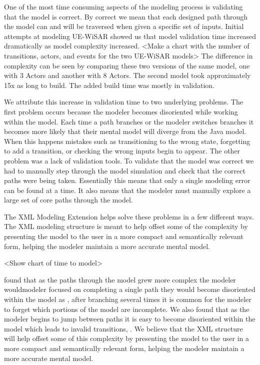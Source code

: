 One of the most time consuming aspects of the modeling process is validating that the model is correct.  By correct we mean that each designed path through the model can and will be traversed when given a specific set of inputs.  Initial attempts at modeling UE-WiSAR showed us that model validation time increased dramatically as model complexity increased.  <Make a chart with the number of transitions, actors, and events for the two UE-WiSAR models>  The difference in complexity can be seen by comparing these two versions of the same model, one with 3 Actors and another with 8 Actors.  The second model took approximately 15x as long to build.  The added build time was mostly in validation.

We attribute this increase in validation time to two underlying problems.  The first problem occurs because the modeler becomes disoriented while working within the model.  Each time a path branches or the modeler switches branches it becomes more likely that their mental model will diverge from the Java model.  When this happens mistakes such as transitioning to the wrong state, forgetting to add a transition, or checking the wrong inputs begin to appear.  The other problem was a lack of validation tools.  To validate that the model was correct we had to manually step through the model simulation and check that the correct paths were being taken.  Essentially this means that only a single modeling error can be found at a time.  It also means that the modeler must manually explore a large set of core paths through the model.

The XML Modeling Extension helps solve these problems in a few different ways.  The XML modeling structure is meant to help offset some of the complexity by presenting the model to the user in a more compact and semantically relevant form, helping the modeler maintain a more accurate mental model.


<Show chart of time to model>

 found that as the paths through the model grew more complex the modeler wouldmodeler focused on completing a single path they would become disoriented within the model as , after branching several times it is common for the modeler to forget which portions of the model are incomplete.  We also found that as the modeler begins to jump between paths it is easy to become disoriented within the model which leads to invalid transitions, .  We believe that the XML structure will help offset some of this complexity by presenting the model to the user in a more compact and semantically relevant form, helping the modeler maintain a more accurate mental model.

